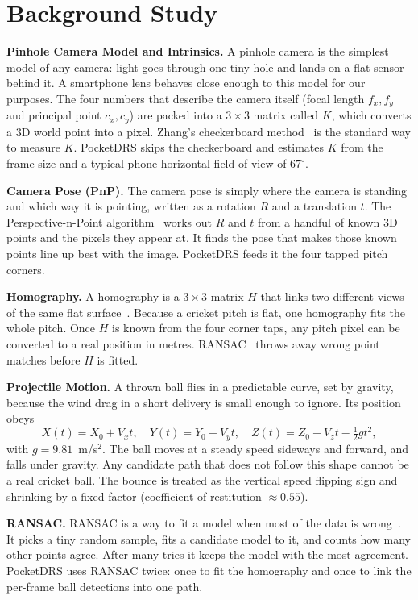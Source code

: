 \documentclass[12pt,a4paper]{report}
\begin{document}
\section{Background Study}

\textbf{Pinhole Camera Model and Intrinsics.} A pinhole camera is the simplest model of any camera: light goes through one tiny hole and lands on a flat sensor behind it. A smartphone lens behaves close enough to this model for our purposes. The four numbers that describe the camera itself (focal length $f_x, f_y$ and principal point $c_x, c_y$) are packed into a $3\times3$ matrix called $K$, which converts a 3D world point into a pixel. Zhang's checkerboard method~\cite{zhang2000} is the standard way to measure $K$. PocketDRS skips the checkerboard and estimates $K$ from the frame size and a typical phone horizontal field of view of $67^{\circ}$.

\textbf{Camera Pose (PnP).} The camera pose is simply where the camera is standing and which way it is pointing, written as a rotation $R$ and a translation $t$. The Perspective-n-Point algorithm~\cite{bradski2008} works out $R$ and $t$ from a handful of known 3D points and the pixels they appear at. It finds the pose that makes those known points line up best with the image. PocketDRS feeds it the four tapped pitch corners.

\textbf{Homography.} A homography is a $3\times3$ matrix $H$ that links two different views of the same flat surface~\cite{hartley2004}. Because a cricket pitch is flat, one homography fits the whole pitch. Once $H$ is known from the four corner taps, any pitch pixel can be converted to a real position in metres. RANSAC~\cite{fischler1981} throws away wrong point matches before $H$ is fitted.

\textbf{Projectile Motion.} A thrown ball flies in a predictable curve, set by gravity, because the wind drag in a short delivery is small enough to ignore. Its position obeys
\[
X(t) = X_0 + V_x t,\quad Y(t) = Y_0 + V_y t,\quad Z(t) = Z_0 + V_z t - \tfrac{1}{2} g t^2,
\]
with $g = 9.81$~m/s$^2$. The ball moves at a steady speed sideways and forward, and falls under gravity. Any candidate path that does not follow this shape cannot be a real cricket ball. The bounce is treated as the vertical speed flipping sign and shrinking by a fixed factor (coefficient of restitution $\approx 0.55$).

\textbf{RANSAC.} RANSAC is a way to fit a model when most of the data is wrong~\cite{fischler1981}. It picks a tiny random sample, fits a candidate model to it, and counts how many other points agree. After many tries it keeps the model with the most agreement. PocketDRS uses RANSAC twice: once to fit the homography and once to link the per-frame ball detections into one path.
\end{document}
